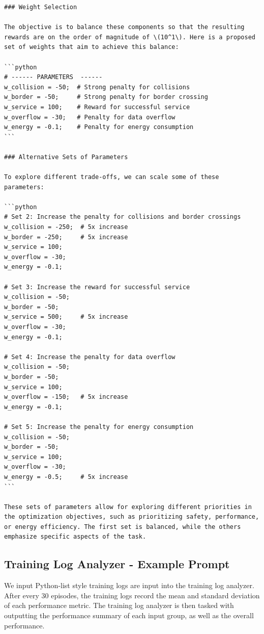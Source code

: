 \documentclass{article}
\begin{document}
\begin{verbatim}
### Weight Selection

The objective is to balance these components so that the resulting rewards are on the order of magnitude of \(10^1\). Here is a proposed set of weights that aim to achieve this balance:

```python
# ------ PARAMETERS  ------
w_collision = -50;  # Strong penalty for collisions
w_border = -50;     # Strong penalty for border crossing
w_service = 100;    # Reward for successful service
w_overflow = -30;   # Penalty for data overflow
w_energy = -0.1;    # Penalty for energy consumption
```

### Alternative Sets of Parameters

To explore different trade-offs, we can scale some of these parameters:

```python
# Set 2: Increase the penalty for collisions and border crossings
w_collision = -250;  # 5x increase
w_border = -250;     # 5x increase
w_service = 100;
w_overflow = -30;
w_energy = -0.1;

# Set 3: Increase the reward for successful service
w_collision = -50;
w_border = -50;
w_service = 500;     # 5x increase
w_overflow = -30;
w_energy = -0.1;

# Set 4: Increase the penalty for data overflow
w_collision = -50;
w_border = -50;
w_service = 100;
w_overflow = -150;   # 5x increase
w_energy = -0.1;

# Set 5: Increase the penalty for energy consumption
w_collision = -50;
w_border = -50;
w_service = 100;
w_overflow = -30;
w_energy = -0.5;     # 5x increase
```

These sets of parameters allow for exploring different priorities in the optimization objectives, such as prioritizing safety, performance, or energy efficiency. The first set is balanced, while the others emphasize specific aspects of the task.
\end{verbatim}

\subsection{Training Log Analyzer - Example Prompt}


We input Python-list style training logs are input into the training log analyzer. After every 30 episodes, the training logs record the mean and standard deviation of each performance metric. The training log analyzer is then tasked with outputting the performance summary of each input group, as well as the overall performance.
\end{document}
